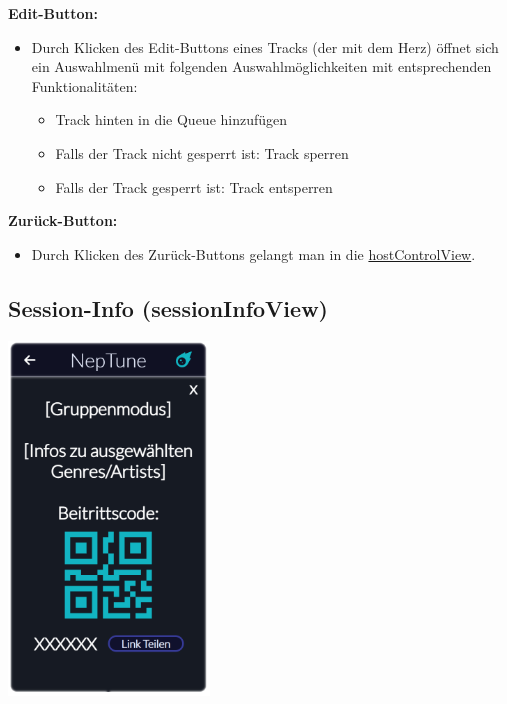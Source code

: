 \documentclass[oneside, ngerman]{sdqtechreport}
\begin{document}
\textbf{Edit-Button:}
\begin{itemize}
    \item Durch Klicken des Edit-Buttons eines Tracks (der mit dem Herz) öffnet sich ein Auswahlmenü mit folgenden Auswahlmöglichkeiten mit entsprechenden Funktionalitäten:
    \begin{itemize}
        \item Track hinten in die Queue hinzufügen
        \item Falls der Track nicht gesperrt ist: Track sperren
        \item Falls der Track gesperrt ist: Track entsperren
    \end{itemize}
\end{itemize}

\textbf{Zurück-Button:}
\begin{itemize}
    \item Durch Klicken des Zurück-Buttons gelangt man in die  \hyperlink{hostControlView}{hostControlView}.
\end{itemize}


\subsection{Session-Info (sessionInfoView)}
\label{sec:Benutzeroberfläche:sessionInfoView}


\begin{center}
    \hypertarget{sessionInfoView}{}
    \includegraphics[width=0.4\textwidth]{LATEX/Pflichtenheft/GraphicDesigns/shareLinkPopUpPage.png}
\end{center}
\end{document}
